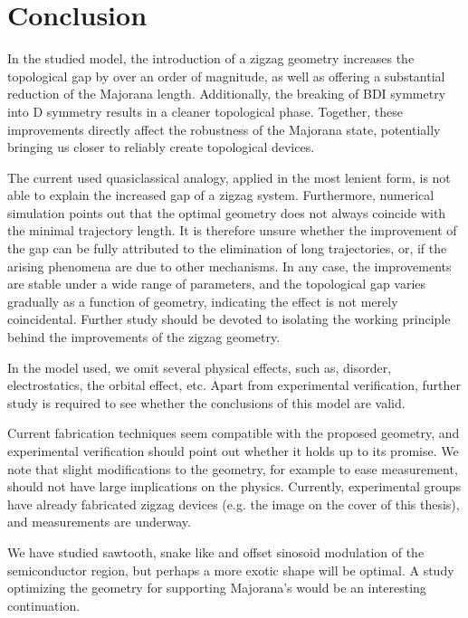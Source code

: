\chapter{Conclusion}
In the studied model, the introduction of a zigzag geometry increases the topological gap by over an order of magnitude, as well as offering a substantial reduction of the Majorana length.
Additionally, the breaking of BDI symmetry into D symmetry results in a cleaner topological phase.
Together, these improvements directly affect the robustness of the Majorana state, potentially bringing us closer to reliably create topological devices.

The current used quasiclassical analogy, applied in the most lenient form, is not able to explain the increased gap of a zigzag system.
Furthermore, numerical simulation points out that the optimal geometry does not always coincide with the minimal trajectory length.
It is therefore unsure whether the improvement of the gap can be fully attributed to the elimination of long trajectories, or, if the arising phenomena are due to other mechanisms.
In any case, the improvements are stable under a wide range of parameters, and the topological gap varies gradually as a function of geometry, indicating the effect is not merely coincidental.
Further study should be devoted to isolating the working principle behind the improvements of the zigzag geometry.

In the model used, we omit several physical effects, such as, disorder, electrostatics, the orbital effect, etc.
Apart from experimental verification, further study is required to see whether the conclusions of this model are valid.

Current fabrication techniques seem compatible with the proposed geometry, and experimental verification should point out whether it holds up to its promise.
We note that slight modifications to the geometry, for example to ease measurement, should not have large implications on the physics.
Currently, experimental groups have already fabricated zigzag devices (e.g. the image on the cover of this thesis), and measurements are underway.

We have studied sawtooth, snake like and offset sinosoid modulation of the semiconductor region, but perhaps a more exotic shape will be optimal.
A study optimizing the geometry for supporting Majorana's would be an interesting continuation.
